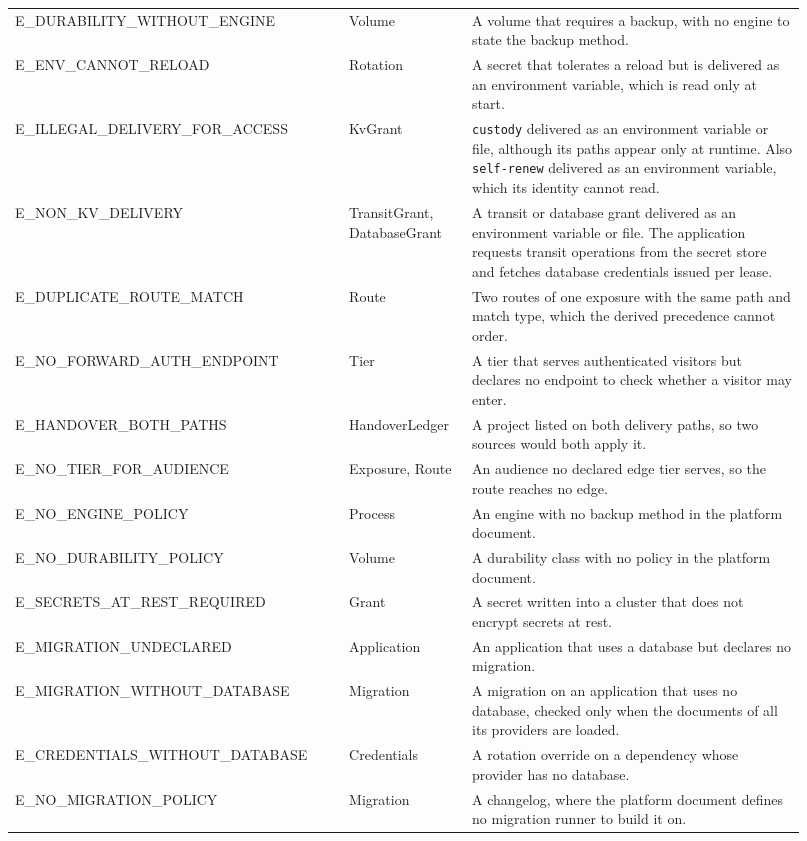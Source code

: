 \begin{table}[H]
\begin{tabular}{>{\raggedright\arraybackslash}p{0.39\linewidth}>{\raggedright\arraybackslash}p{0.14\linewidth}>{\raggedright\arraybackslash}p{0.39\linewidth}}
E\_DURABILITY\_WITHOUT\_ENGINE & Volume & A volume that requires a backup, with no engine to state the backup method. \\
E\_ENV\_CANNOT\_RELOAD & Rotation & A secret that tolerates a reload but is delivered as an environment variable, which is read only at start. \\
E\_ILLEGAL\_DELIVERY\_FOR\_ACCESS & KvGrant & \texttt{custody} delivered as an environment variable or file, although its paths appear only at runtime. Also \texttt{self-renew} delivered as an environment variable, which its identity cannot read. \\
E\_NON\_KV\_DELIVERY & TransitGrant, DatabaseGrant & A transit or database grant delivered as an environment variable or file. The application requests transit operations from the secret store and fetches database credentials issued per lease. \\
E\_DUPLICATE\_ROUTE\_MATCH & Route & Two routes of one exposure with the same path and match type, which the derived precedence cannot order. \\
E\_NO\_FORWARD\_AUTH\_ENDPOINT & Tier & A tier that serves authenticated visitors but declares no endpoint to check whether a visitor may enter. \\
E\_HANDOVER\_BOTH\_PATHS & HandoverLedger & A project listed on both delivery paths, so two sources would both apply it. \\
E\_NO\_TIER\_FOR\_AUDIENCE & Exposure, Route & An audience no declared edge tier serves, so the route reaches no edge. \\
E\_NO\_ENGINE\_POLICY & Process & An engine with no backup method in the platform document. \\
E\_NO\_DURABILITY\_POLICY & Volume & A durability class with no policy in the platform document. \\
E\_SECRETS\_AT\_REST\_REQUIRED & Grant & A secret written into a cluster that does not encrypt secrets at rest. \\
E\_MIGRATION\_UNDECLARED & Application & An application that uses a database but declares no migration. \\
E\_MIGRATION\_WITHOUT\_DATABASE & Migration & A migration on an application that uses no database, checked only when the documents of all its providers are loaded. \\
E\_CREDENTIALS\_WITHOUT\_DATABASE & Credentials & A rotation override on a dependency whose provider has no database. \\
E\_NO\_MIGRATION\_POLICY & Migration & A changelog, where the platform document defines no migration runner to build it on. \\

\end{tabular}
\end{table}
